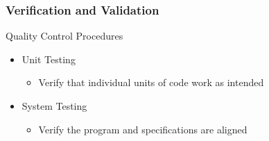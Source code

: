 \documentclass[t,12pt,numbers,fleqn]{beamer}
\begin{document}
\begin{frame}


\frametitle{Verification and Validation}
Quality Control Procedures
\begin{itemize}
    \item Unit Testing
    \begin{itemize}
        \item Verify that individual units of code work as intended
    \end{itemize}
    \item System Testing
    \begin{itemize}
        \item Verify the program and specifications are aligned
    \end{itemize}
\end{itemize}
\end{frame}
\end{document}
